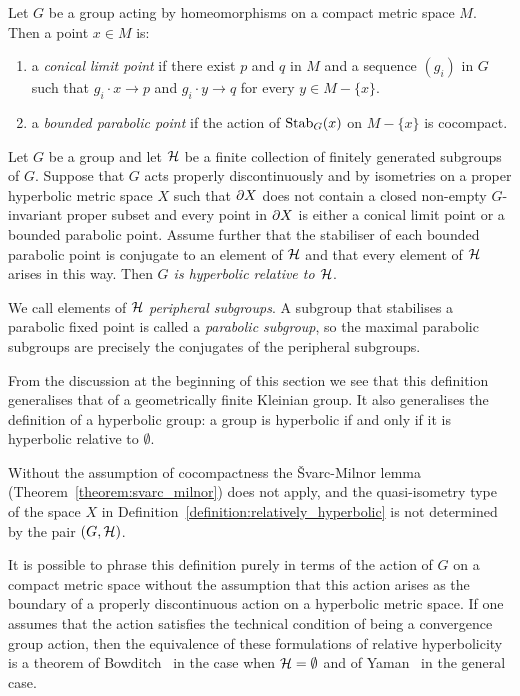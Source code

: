 \begin{definition}
  Let $G$ be a group acting by homeomorphisms on a compact metric space $M$.
  Then a point $x \in M$ is:
  \begin{enumerate}
    \item a \emph{conical limit point} if there exist $p$ and $q$ in $M$ and a sequence $(g_i)$ in $G$ such that $g_i\cdot x \to p$ and $g_i\cdot y \to q$ for every $y \in M - \{x\}$.
    \item a \emph{bounded parabolic point} if the action of $\mathrm{Stab}_G(x)$ on $M - \{x\}$ is cocompact.
  \end{enumerate}
\end{definition}

\begin{definition}\label{definition:relatively_hyperbolic} 
  Let $G$ be a group and let $\mathcal{H}$ be a finite collection of finitely generated subgroups of $G$.
  Suppose that $G$ acts properly discontinuously and by isometries on a proper hyperbolic metric space $X$ such that $\partial X$ does not contain a closed non-empty $G$-invariant proper subset and every point in $\partial X$ is either a conical limit point or a bounded parabolic point.
  Assume further that the stabiliser of each bounded parabolic point is conjugate to an element of $\mathcal{H}$ and that every element of $\mathcal{H}$ arises in this way.
  Then \emph{$G$ is hyperbolic relative to $\mathcal{H}$}.

  We call elements of $\mathcal{H}$ \emph{peripheral subgroups}.
  A subgroup that stabilises a parabolic fixed point is called a \emph{parabolic subgroup}, so the maximal parabolic subgroups are precisely the conjugates of the peripheral subgroups.
\end{definition}

From the discussion at the beginning of this section we see that this definition generalises that of a geometrically finite Kleinian group.
It also generalises the definition of a hyperbolic group: a group is hyperbolic if and only if it is hyperbolic relative to $\emptyset$.

\begin{remark}
  Without the assumption of cocompactness the \v{S}varc-Milnor lemma (Theorem~\ref{theorem:svarc_milnor}) does not apply, and the quasi-isometry type of the space $X$ in Definition~\ref{definition:relatively_hyperbolic} is not determined by the pair $(G, \mathcal{H})$.
\end{remark}

\begin{remark}
  It is possible to phrase this definition purely in terms of the action of $G$ on a compact metric space without the assumption that this action arises as the boundary of a properly discontinuous action on a hyperbolic metric space.
  If one assumes that the action satisfies the technical condition of being a convergence group action, then the equivalence of these formulations of relative hyperbolicity is a theorem of Bowditch~\cite{bowditch98c} in the case when $\mathcal{H} = \emptyset$ and of Yaman~\cite{yaman04} in the general case.
\end{remark}

